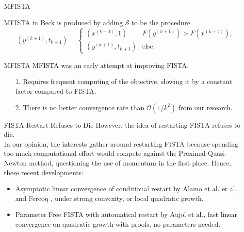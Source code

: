 \documentclass[11pt]{beamer}
\theoremstyle{definition}
\begin{document}
    \begin{frame}{MFISTA}
        \begin{algorithm}[H]
            \begin{tiny}
                \begin{algorithmic}[1]
                    \ENDFOR
                \end{algorithmic}
                \caption{Generic FISTA}    
            \end{tiny}
        \end{algorithm}
        MFISTA in Beck\cite{beck_fast_2009} is produced by adding $\mathcal S$ to be the procedure
        \[
            (y^{(k + 1)}, t_{k + 1}) = \begin{cases}
                (x^{(k + 1)}, 1) & F(y^{(k + 1)}) > F(x^{(k + 1)}),
                \\
                (y^{(k + 1)}, t_{k + 1}) & \text{else}. 
            \end{cases}
        \]
    \end{frame}
    \begin{frame}{MFISTA}
        MFISTA was an early attempt at improving FISTA. 
        \begin{itemize}
            \item [1.] Requires frequent computing of the objective, slowing it by a constant factor compared to FISTA. 
            \item [2.] There is no better convergence rate than $\mathcal O(1/k^2)$ from our research. 
        \end{itemize}
    \end{frame}
    \begin{frame}{FISTA Restart Refuses to Die}
        However, the idea of restarting FISTA refuses to die. 
        \\
        In our opinion, the interests gather around restarting FISTA because spending too much computational effort would compete against the Proximal Quasi-Newton method, questioning the use of momentum in the ﬁrst place. Hence, these recent developments:
        \begin{itemize}
            \item Asymptotic linear convergence of conditional restart by Alamo et al. \cite{alamo_restart_2019}\cite[text]{alamo_gradient_2019} et al., and Fercoq \cite{fercoq_adaptive_2019}, under strong convexity, or local quadratic growth. 
            \item Parameter Free FISTA with automatical restart by Aujol et al.\cite{aujol_parameter-free_2023}, fast linear convergence on quadratic growth with proofs, no parameters needed.
        \end{itemize}
    \end{frame}
\end{document}
